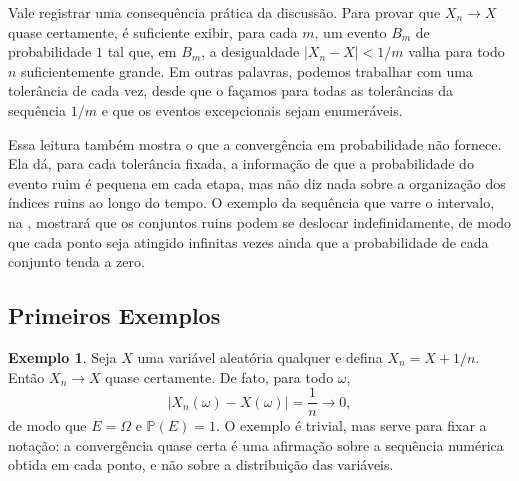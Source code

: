 \documentclass[12pt,portuguese]{article}
\theoremstyle{definition}
\newtheorem{example}[example]{Exemplo}
\theoremstyle{plainexercise}
\theoremstyle{starredexercise}
\theoremstyle{definition}
\begin{document}
Vale registrar uma consequência prática da discussão. Para provar que
$X_n\to X$ quase certamente, é suficiente exibir, para cada $m$, um evento
$B_m$ de probabilidade $1$ tal que, em $B_m$, a desigualdade
$|X_n-X|<1/m$ valha para todo $n$ suficientemente grande. Em outras palavras,
podemos trabalhar com uma tolerância de cada vez, desde que o façamos para
todas as tolerâncias da sequência $1/m$ e que os eventos excepcionais sejam
enumeráveis.

Essa leitura também mostra o que a convergência em probabilidade não fornece.
Ela dá, para cada tolerância fixada, a informação de que a probabilidade do
evento ruim é pequena em cada etapa, mas não diz nada sobre a organização dos
índices ruins ao longo do tempo. O exemplo da sequência que varre o intervalo,
na , mostrará que os conjuntos ruins podem se deslocar
indefinidamente, de modo que cada ponto seja atingido infinitas vezes ainda que
a probabilidade de cada conjunto tenda a zero.

\subsection{Primeiros Exemplos}\label{subsec:qc-exemplos}

\begin{example}\label{ex:qc-translacao}
Seja $X$ uma variável aleatória qualquer e defina $X_n=X+1/n$. Então
$X_n\to X$ quase certamente. De fato, para todo $\omega$,
\[
|X_n(\omega)-X(\omega)|=\frac{1}{n}\longrightarrow0,
\]
de modo que $E=\Omega$ e $\mathbb{P}(E)=1$. O exemplo é trivial, mas serve para
fixar a notação: a convergência quase certa é uma afirmação sobre a sequência
numérica obtida em cada ponto, e não sobre a distribuição das variáveis.
\end{example}
\end{document}
